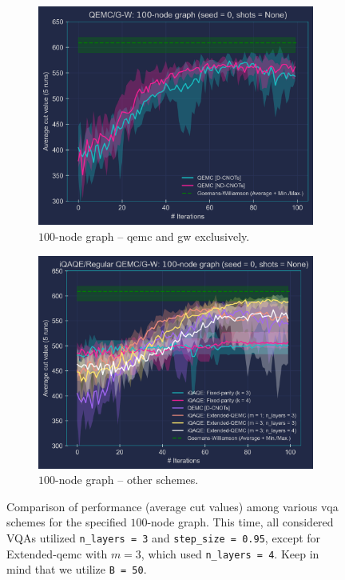 \begin{figure}[hb!]
    \centering
    \begin{subfigure}[b]{0.495\textwidth}
        \centering
        \includegraphics[width=1\textwidth, height=0.812\textwidth]{Figures/Chapter_5/Large graphs/100-node_Graph(QEMC&G-W)_seed=0.png}
        \caption{$100$-node graph – \acrshort{qemc} and \acrshort{gw} exclusively.}
        \label{fig:100-node_Graph(QEMC&G-W)}
    \end{subfigure}
    \hfill
    \begin{subfigure}[b]{0.495\textwidth}
        \centering
        \includegraphics[width=1\textwidth, height=0.812\textwidth]{Figures/Chapter_5/Large graphs/100-node_Graph_seed=0.png}
        \caption{$100$-node graph – other schemes.}
        \label{fig:100-node_Graph}
    \end{subfigure}
    \caption{Comparison of performance (average cut values) among various \acrshort{vqa} schemes for the specified $100$-node graph. This time, all considered VQAs utilized \texttt{n\_layers = 3} and \texttt{step\_size = 0.95}, except for Extended-\acrshort{qemc} with $m=3$, which used \texttt{n\_layers = 4}. Keep in mind that we utilize \texttt{B = 50}.}
    \label{fig:100-node_Graph(2-Subfigures)}
\end{figure}
